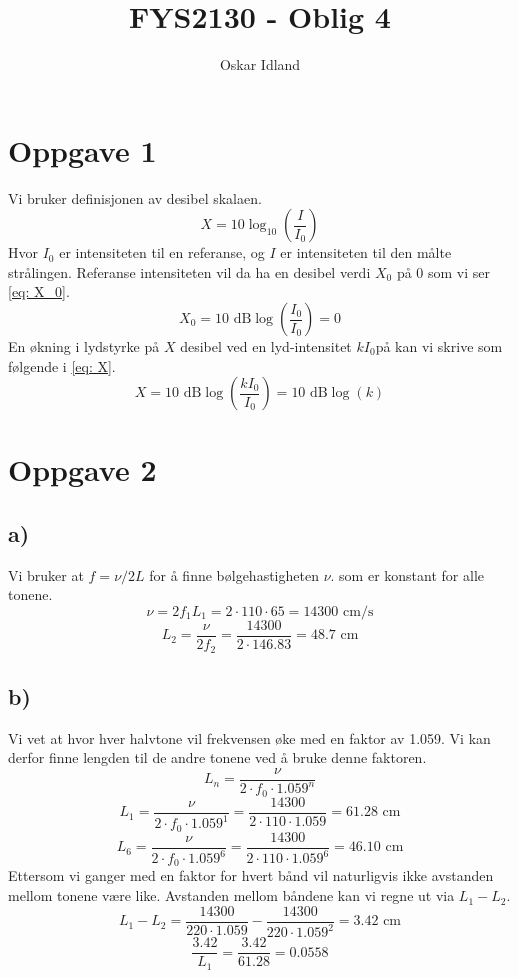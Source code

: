 \documentclass[norsk]{article}
\author{Oskar Idland}
\title{FYS2130 - Oblig 4}
\date{}
\begin{document}
\maketitle
\newpage
\section*{Oppgave 1}
Vi bruker definisjonen av desibel skalaen. 
\begin{equation}
  X = 10\log_{10}\left(\frac{I}{I_0}\right)
\end{equation}
Hvor $I_0$ er intensiteten til en referanse, og $I$ er intensiteten til den målte strålingen. Referanse intensiteten vil da ha en desibel verdi $X_0$ på 0 som vi ser \cref{eq: X_0}. 
\begin{equation}\label{eq: X_0}
  X_0 = 10 \text{ dB} \log \left(\frac{I_0}{I_0}\right) = 0
\end{equation}
En økning i lydstyrke på $X$ desibel ved en lyd-intensitet $k I_0$på  kan vi skrive som følgende i \cref{eq: X}.
\begin{equation}\label{eq: X}
  X = 10 \text{ dB} \log \left(\frac{kI_0}{I_0}\right) = 10 \text{ dB} \log \left(k\right)
\end{equation}

\section*{Oppgave 2}
\subsection*{a)}
Vi bruker at $f = ν / 2L$ for å finne bølgehastigheten $ν$. som er konstant for alle tonene. 
\[
ν = 2f_1L_1 = 2 ⋅ 110 ⋅ 65 = 14300 \text{ cm/s}
\]
\[
L_2 = \frac{ν}{2f_2} = \frac{14300}{2 ⋅ 146.83} = 48.7 \text{ cm}
\]
\subsection*{b)}
Vi vet at hvor hver halvtone vil frekvensen øke med en faktor av 1.059. Vi kan derfor finne lengden til de andre tonene ved å bruke denne faktoren.
\[
L_n = \frac{ν}{2 ⋅ f_0 ⋅ 1.059^{n}}
\]
\[
L_1 = \frac{ν}{2 ⋅ f_0 ⋅ 1.059^{1}} = \frac{14300}{2 ⋅ 110 ⋅ 1.059} = 61.28 \text{ cm}
\]
\[
L_6 = \frac{ν}{2 ⋅ f_0 ⋅ 1.059^{6}} = \frac{14300}{2 ⋅ 110 ⋅ 1.059^6} = 46.10 \text{ cm}
\]
Ettersom vi ganger med en faktor for hvert bånd vil naturligvis ikke avstanden mellom tonene være like. Avstanden  mellom båndene kan vi regne ut via $L_1 - L_2$. 
\[
L_1 - L_2 = \frac{14300}{220 ⋅ 1.059} - \frac{14300}{220 ⋅ 1.059^2} = 3.42 \text{ cm} 
\]
\[
\frac{3.42}{L_1} = \frac{3.42}{61.28} = 0.0558
\]
\end{document}
